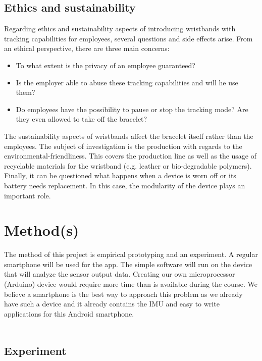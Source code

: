 \documentclass[12pt,twoside, hidelinks]{article}
\begin{document}
\subsection{Ethics and sustainability}
\label{sect:ethics}

Regarding ethics and sustainability aspects of introducing wristbands with tracking capabilities for employees, several questions and side effects arise. From an ethical perspective, there are three main concerns: 
\begin{itemize}
	\item To what extent is the privacy of an employee guaranteed?
	\item Is the employer able to abuse these tracking capabilities and will he use them?
	\item Do employees have the possibility to pause or stop the tracking mode? Are they even allowed to take off the bracelet?
\end{itemize}
The sustainability aspects of wristbands affect the bracelet itself rather than the employees. The subject of investigation is the production with regards to the environmental-friendliness. This covers the production line as well as the usage of recyclable materials for the wristband (e.g. leather or bio-degradable polymers). Finally, it can be questioned what happens when a device is worn off or its battery needs replacement. In this case, the modularity of the device plays an important role.

\section{Method(s)}
\label{sec:method}


The method of this project is empirical prototyping and an experiment. A regular smartphone will be used for the app. The simple software will run on the device that will analyze the sensor output data. Creating our own microprocessor (Arduino) device would require more time than is available during the course. We believe a smartphone is the best way to approach this problem as we already have such a device and it already contains the IMU and easy to write applications for this Android smartphone.
\\
\\

\subsection{Experiment}
\label{sect:experiment}
\end{document}
